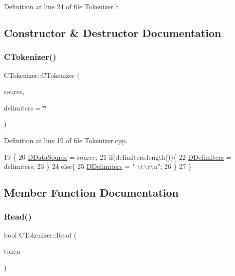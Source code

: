 Definition at line 24 of file Tokenizer.\+h.



\subsection{Constructor \& Destructor Documentation}
\hypertarget{classCTokenizer_abb6403c9fb2fe0e5d2a4349d7bcbf3ef}{}\label{classCTokenizer_abb6403c9fb2fe0e5d2a4349d7bcbf3ef} 
\subsubsection{\texorpdfstring{C\+Tokenizer()}{CTokenizer()}}
{\footnotesize\ttfamily C\+Tokenizer\+::\+C\+Tokenizer (\begin{DoxyParamCaption}\item[{std\+::shared\+\_\+ptr$<$ \hyperlink{classCDataSource}{C\+Data\+Source} $>$}]{source,  }\item[{const std\+::string}]{delimiters = {\ttfamily \char`\"{}\char`\"{}} }\end{DoxyParamCaption})}



Definition at line 19 of file Tokenizer.\+cpp.


\begin{DoxyCode}
19                                                                                      \{
20     \hyperlink{classCTokenizer_aaa6faab432000d3f942a0c14fc09f60b}{DDataSource} = source;
21     \textcolor{keywordflow}{if}(delimiters.length())\{
22         \hyperlink{classCTokenizer_ad1edcf297f5f9ccf43dc32a992556f52}{DDelimiters} = delimiters;
23     \}
24     \textcolor{keywordflow}{else}\{
25         \hyperlink{classCTokenizer_ad1edcf297f5f9ccf43dc32a992556f52}{DDelimiters} = \textcolor{stringliteral}{" \(\backslash\)t\(\backslash\)r\(\backslash\)n"};
26     \}
27 \}
\end{DoxyCode}


\subsection{Member Function Documentation}
\hypertarget{classCTokenizer_ab3afe12900a14497129426e46d9f65d9}{}\label{classCTokenizer_ab3afe12900a14497129426e46d9f65d9} 
\subsubsection{\texorpdfstring{Read()}{Read()}}
{\footnotesize\ttfamily bool C\+Tokenizer\+::\+Read (\begin{DoxyParamCaption}\item[{std\+::string \&}]{token }\end{DoxyParamCaption})}




